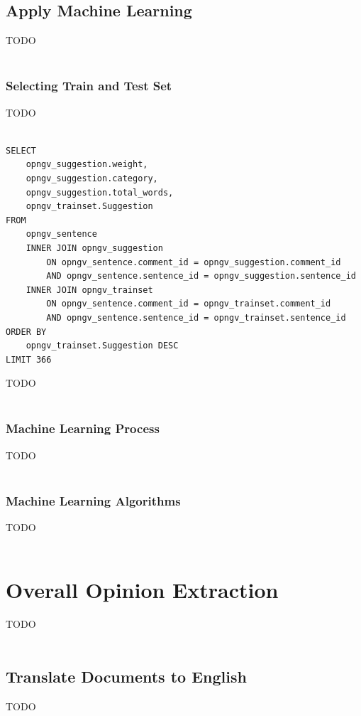\subsection{Apply Machine Learning}\label{335_ref}
TODO\\
\\
\subsubsection{Selecting Train and Test Set}\label{3351_ref}
TODO\\
\\
\lstset{language=SQL}
\begin{lstlisting}[frame=single, basicstyle=\small]
SELECT
	opngv_suggestion.weight,
	opngv_suggestion.category,
	opngv_suggestion.total_words,
	opngv_trainset.Suggestion
FROM
	opngv_sentence
	INNER JOIN opngv_suggestion
		ON opngv_sentence.comment_id = opngv_suggestion.comment_id
		AND opngv_sentence.sentence_id = opngv_suggestion.sentence_id
	INNER JOIN opngv_trainset
		ON opngv_sentence.comment_id = opngv_trainset.comment_id
		AND opngv_sentence.sentence_id = opngv_trainset.sentence_id
ORDER BY
	opngv_trainset.Suggestion DESC
LIMIT 366
\end{lstlisting}
TODO\\
\\

\subsubsection{Machine Learning Process}\label{3352_ref}
TODO\\
\\
\subsubsection{Machine Learning Algorithms}\label{3353_ref}
TODO\\
\\
\section{Overall Opinion Extraction}\label{34_ref}
TODO\\
\\
\subsection{Translate Documents to English}\label{341_ref}
TODO\\
\\
